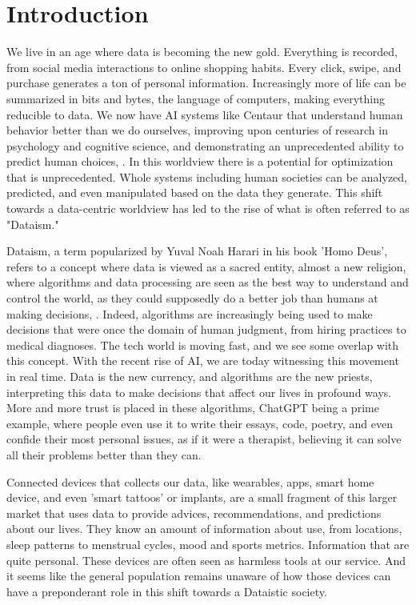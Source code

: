 
\section{Introduction}
We live in an age where data is becoming the new gold. Everything is recorded, from social media interactions to online shopping habits. Every click, swipe, and purchase generates a ton of personal information. Increasingly more of life can be summarized in bits and bytes, the language of computers, making everything reducible to data. We now have AI systems like Centaur that understand human behavior better than we do ourselves, improving upon centuries of research in psychology and cognitive science, and demonstrating an unprecedented ability to predict human choices, \cite{Binz2025}. In this worldview there is a potential for optimization that is unprecedented. Whole systems including human societies can be analyzed, predicted, and even manipulated based on the data they generate. This shift towards a data-centric worldview has led to the rise of what is often referred to as "Dataism."

Dataism, a term popularized by Yuval Noah Harari in his book 'Homo Deus', refers to a concept where data is viewed as a sacred entity, almost a new religion, where algorithms and data processing are seen as the best way to understand and control the world, as they could supposedly do a better job than humans at making decisions, \cite{Harari2017}. Indeed, algorithms are increasingly being used to make decisions that were once the domain of human judgment, from hiring practices to medical diagnoses. The tech world is moving fast, and we see some overlap with this concept. With the recent rise of AI, we are today witnessing this movement in real time. Data is the new currency, and algorithms are the new priests, interpreting this data to make decisions that affect our lives in profound ways. More and more trust is placed in these algorithms, ChatGPT being a prime example, where people even use it to write their essays, code, poetry, and even confide their most personal issues, as if it were a therapist, believing it can solve all their problems better than they can.

Connected devices that collects our data, like wearables, apps, smart home device, and even 'smart tattoos' or implants, are a small fragment of this larger market that uses data to provide advices, recommendations, and predictions about our lives. They know an amount of information about use, from locations, sleep patterns to menstrual cycles, mood and sports metrics. Information that are quite personal. These devices are often seen as harmless tools at our service. And it seems like the general population remains unaware of how those devices can have a preponderant role in this shift towards a Dataistic society.

